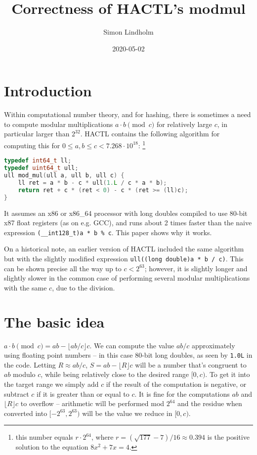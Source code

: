 \documentclass{article}
\title{Correctness of HACTL's modmul}
\author{Simon Lindholm}
\date{2020-05-02}
\begin{document}
\maketitle

\section{Introduction}

Within computational number theory, and for hashing, there is sometimes a need to compute modular multiplications $a \cdot b \pmod{c}$ for relatively large $c$, in particular larger than $2^{32}$. HACTL contains the following algorithm for computing this for $0 \le a, b \le c < 7.268\cdot 10^{18}$: \footnote{this number equals $r \cdot 2^{64}$, where $r = (\sqrt{177} - 7) / 16 \approx 0.394$ is the positive solution to the equation $8x^2 + 7x = 4$.}

\begin{lstlisting}[language=C++]
typedef int64_t ll;
typedef uint64_t ull;
ull mod_mul(ull a, ull b, ull c) {
    ll ret = a * b - c * ull(1.L / c * a * b);
    return ret + c * (ret < 0) - c * (ret >= (ll)c);
}
\end{lstlisting}

\noindent
It assumes an x86 or x86\_64 processor with long doubles compiled to use 80-bit x87 float registers (as on e.g. GCC),
and runs about 2 times faster than the naive expression \lstinline{(__int128_t)a * b % c}.
This paper shows why it works.

On a historical note, an earlier version of HACTL included the same algorithm but with the slightly modified expression \texttt{ull((long double)a * b / c)}. This can be shown precise all the way up to $c < 2^{63}$; however, it is slightly longer and slightly slower in the common case of performing several modular multiplications with the same $c$, due to the division.

\section{The basic idea}

$a \cdot b \pmod{c} = ab - \lfloor ab/c \rfloor c$. We can compute the value $ab/c$ approximately using floating point numbers -- in this case 80-bit long doubles, as seen by \texttt{1.0L} in the code. Letting $R \approx ab/c$, $S = ab - \lfloor R \rfloor c$ will be a number that's congruent to $ab$ modulo $c$, while being relatively close to the desired range $[0, c)$. To get it into the target range we simply add $c$ if the result of the computation is negative, or subtract $c$ if it is greater than or equal to $c$. It is fine for the computations $ab$ and $\lfloor R \rfloor c$ to overflow -- arithmetic will be performed mod $2^{64}$ and the residue when converted into $[-2^{63}, 2^{63})$ will be the value we reduce in $[0, c)$.
\end{document}
